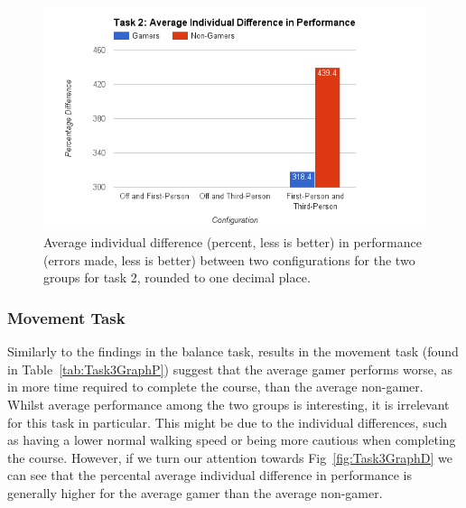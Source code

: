 \documentclass[runningheads,a4paper,oribibl]{llncs}
\begin{document}

\begin{figure}
   \centering
   \includegraphics[width=\textwidth]{ExternalMaterial/Task2GraphD}
   \caption{Average individual difference (percent, less is better) in performance (errors made, less is better) between two configurations for the two groups for task 2, rounded to one decimal place.} \label{fig:Task2GraphD}
\end{figure}













\subsubsection{Movement Task}
Similarly to the findings in the balance task, results in the movement task (found in Table~\ref{tab:Task3GraphP}) suggest that the average gamer performs worse, as in more time required to complete the course, than the average non-gamer. 
Whilst average performance among the two groups is interesting, it is irrelevant for this task in particular. This might be due to the individual differences, such as having a lower normal walking speed or being more cautious when completing the course. However, if we turn our attention towards Fig~\ref{fig:Task3GraphD} we can see that the percental average individual difference in performance is generally higher for the average gamer than the average non-gamer.
\end{document}
